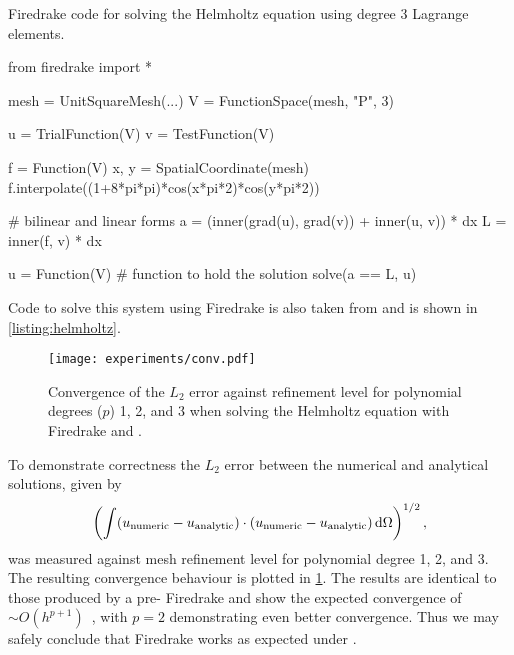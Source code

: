 \documentclass[thesis]{subfiles}
\begin{document}
\begin{listing}
  \centering
  \caption{Firedrake code for solving the Helmholtz equation using degree 3 Lagrange elements.}
  \begin{minipage}{.9\textwidth}
    \begin{pyalg2}
      from firedrake import *

      mesh = UnitSquareMesh(...)
      V = FunctionSpace(mesh, "P", 3)

      u = TrialFunction(V)
      v = TestFunction(V)

      f = Function(V)
      x, y = SpatialCoordinate(mesh)
      f.interpolate((1+8*pi*pi)*cos(x*pi*2)*cos(y*pi*2))

      # bilinear and linear forms
      a = (inner(grad(u), grad(v)) + inner(u, v)) * dx
      L = inner(f, v) * dx

      u = Function(V)  # function to hold the solution
      solve(a == L, u)
    \end{pyalg2}
  \end{minipage}
  \label{listing:helmholtz}
\end{listing}

Code to solve this system using Firedrake is also taken from \cite{FiredrakeUserManual} and is shown in \cref{listing:helmholtz}.

\begin{figure}
  \centering
  \texttt{[image: experiments/conv.pdf]}
  \caption{
    Convergence of the $L_2$ error against refinement level for polynomial degrees ($p$) 1, 2, and 3 when solving the Helmholtz equation with Firedrake and .
  }
  \label{fig:helmholtz_conv}
\end{figure}

To demonstrate correctness the $L_2$ error between the numerical and analytical solutions, given by
\begin{equation}
  \left( \int (u_{\textnormal{numeric}}-u_{\textnormal{analytic}}) \cdot (u_{\textnormal{numeric}}-u_{\textnormal{analytic}}) \, \textnormal{d}\Omega \right)^{1/2},
\end{equation}
was measured against mesh refinement level for polynomial degree 1, 2, and 3.
The resulting convergence behaviour is plotted in \cref{fig:helmholtz_conv}.
The results are identical to those produced by a pre- Firedrake and show the expected convergence of $\sim O(h^{p+1})$~\cite{brennerMathematicalTheoryFinite2008}, with $p=2$ demonstrating even better convergence.
Thus we may safely conclude that Firedrake works as expected under .
\end{document}
